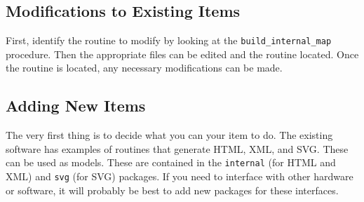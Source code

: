 \documentclass[10pt, openany, draft]{article}
\begin{document}
\subsection{Modifications to Existing Items}
First, identify the routine to modify by looking at the \texttt{build\_internal\_map} procedure.  Then the appropriate files can be edited and the routine located.  Once the routine is located, any necessary modifications can be made.

\subsection{Adding New Items}
The very first thing is to decide what you can your item to do.  The existing software has examples of routines that generate HTML, XML, and SVG.  These can be used as models.  These are contained in the \texttt{internal} (for HTML and XML) and \texttt{svg} (for SVG) packages.  If you need to interface with other hardware or software, it will probably be best to add new packages for these interfaces.
\end{document}
